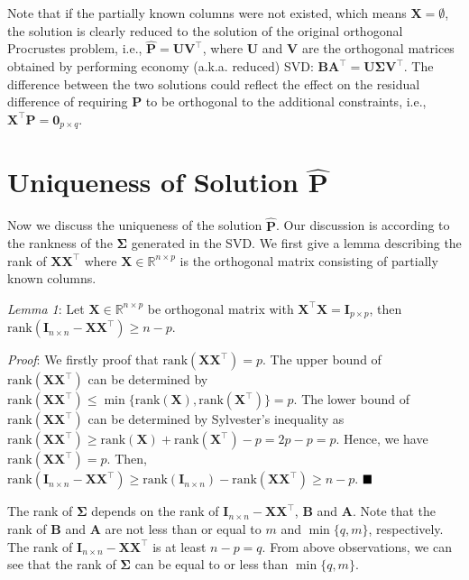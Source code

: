 \documentclass[titlepage,11pt,twoside]{article}
\let\oldemptyset\emptyset
\let\emptyset\varnothing
\begin{document}
Note that if the partially known columns were not existed, which means $\mathbf{X}=\oldemptyset$, the solution is clearly reduced to the solution of the original orthogonal Procrustes problem, i.e., $\mathbf{\hat{P}} = \mathbf{U}\mathbf{V}^{\top}$, where $\mathbf{U}$ and $\mathbf{V}$ are the orthogonal matrices obtained by performing economy (a.k.a. reduced) SVD:
$\mathbf{B}\mathbf{A}^{\top} = \mathbf{U}\mathbf{\mathbf{\Sigma}}\mathbf{V}^{\top}$. 
The difference between the two solutions could reflect the effect on the residual difference of requiring $\mathbf{P}$ to be orthogonal to the additional constraints, i.e., $\mathbf{X}^{\top}\mathbf{P}=\mathbf{0}_{p\times q}$.


\section{Uniqueness of Solution $\mathbf{\hat{P}}$}

Now we discuss the uniqueness of the solution $\mathbf{\hat{P}}$. Our discussion is according to the rankness of the $\mathbf{\Sigma}$ generated in the SVD. We first give a lemma describing the rank of $\mathbf{X}\mathbf{X}^{\top}$ where $\mathbf{X}\in\mathbb{R}^{n\times p}$ is the orthogonal matrix consisting of partially known columns. 

\emph{Lemma 1}: Let $\mathbf{X}\in\mathbb{R}^{n\times p}$ be orthogonal matrix with $\mathbf{X}^{\top}\mathbf{X}=\mathbf{I}_{p\times p}$, then $\text{rank}(\mathbf{I}_{n\times n}-\mathbf{X}\mathbf{X}^{\top})\ge n-p$.

\emph{Proof}: We firstly proof that $\text{rank}(\mathbf{X}\mathbf{X}^{\top})=p$. The upper bound of $\text{rank}(\mathbf{X}\mathbf{X}^{\top})$ can be determined by $\text{rank}(\mathbf{X}\mathbf{X}^{\top})\le\min\{\text{rank}(\mathbf{X}),\text{rank}(\mathbf{X}^{\top})\}=p$. The lower bound of $\text{rank}(\mathbf{X}\mathbf{X}^{\top})$ can be determined by Sylvester's inequality as $\text{rank}(\mathbf{X}\mathbf{X}^{\top})\ge\text{rank}(\mathbf{X})+\text{rank}(\mathbf{X}^{\top})-p=2p-p=p$. Hence, we have $\text{rank}(\mathbf{X}\mathbf{X}^{\top})=p$. Then, $\text{rank}(\mathbf{I}_{n\times n}-\mathbf{X}\mathbf{X}^{\top})\ge\text{rank}(\mathbf{I}_{n\times n})-\text{rank}(\mathbf{X}\mathbf{X}^{\top})\ge n-p$. 
$\hfill\blacksquare$ 

The rank of $\mathbf{\Sigma}$ depends on the rank of $\mathbf{I}_{n\times n}-\mathbf{X}\mathbf{X}^{\top}$, $\mathbf{B}$ and $\mathbf{A}$. Note that the rank of $\mathbf{B}$ and $\mathbf{A}$ are not less than or equal to $m$ and $\min\{q,m\}$, respectively. The rank of $\mathbf{I}_{n\times n}-\mathbf{X}\mathbf{X}^{\top}$ is at least $n-p=q$. From above observations, we can see that the rank of $\mathbf{\Sigma}$ can be equal to or less than $\min\{q,m\}$. 
\end{document}
